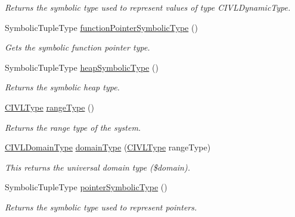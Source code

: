 \begin{DoxyCompactItemize}
\begin{DoxyCompactList}\small\item\em Returns the symbolic type used to represent values of type C\+I\+V\+L\+Dynamic\+Type. \end{DoxyCompactList}\item 
Symbolic\+Tuple\+Type \hyperlink{classedu_1_1udel_1_1cis_1_1vsl_1_1civl_1_1model_1_1common_1_1CommonCIVLTypeFactory_a62fcb953a06c1ffa93f4a15d6cfb5fef}{function\+Pointer\+Symbolic\+Type} ()
\begin{DoxyCompactList}\small\item\em Gets the symbolic function pointer type. \end{DoxyCompactList}\item 
Symbolic\+Tuple\+Type \hyperlink{classedu_1_1udel_1_1cis_1_1vsl_1_1civl_1_1model_1_1common_1_1CommonCIVLTypeFactory_af0242865e6bf093b155b112f68cd97b6}{heap\+Symbolic\+Type} ()
\begin{DoxyCompactList}\small\item\em Returns the symbolic heap type. \end{DoxyCompactList}\item 
\hyperlink{interfaceedu_1_1udel_1_1cis_1_1vsl_1_1civl_1_1model_1_1IF_1_1type_1_1CIVLType}{C\+I\+V\+L\+Type} \hyperlink{classedu_1_1udel_1_1cis_1_1vsl_1_1civl_1_1model_1_1common_1_1CommonCIVLTypeFactory_a4143b4743dfb10d82884755d7edb1762}{range\+Type} ()
\begin{DoxyCompactList}\small\item\em Returns the range type of the system. \end{DoxyCompactList}\item 
\hyperlink{interfaceedu_1_1udel_1_1cis_1_1vsl_1_1civl_1_1model_1_1IF_1_1type_1_1CIVLDomainType}{C\+I\+V\+L\+Domain\+Type} \hyperlink{classedu_1_1udel_1_1cis_1_1vsl_1_1civl_1_1model_1_1common_1_1CommonCIVLTypeFactory_a5cc1f5f9e61ea08214a2a0f642e31dab}{domain\+Type} (\hyperlink{interfaceedu_1_1udel_1_1cis_1_1vsl_1_1civl_1_1model_1_1IF_1_1type_1_1CIVLType}{C\+I\+V\+L\+Type} range\+Type)
\begin{DoxyCompactList}\small\item\em This returns the universal domain type ({\ttfamily \$domain}). \end{DoxyCompactList}\item 
Symbolic\+Tuple\+Type \hyperlink{classedu_1_1udel_1_1cis_1_1vsl_1_1civl_1_1model_1_1common_1_1CommonCIVLTypeFactory_a9e2f11fc8fb724f7ad6f2501645c149a}{pointer\+Symbolic\+Type} ()
\begin{DoxyCompactList}\small\item\em Returns the symbolic type used to represent pointers. \end{DoxyCompactList}\item 

\end{DoxyCompactItemize}
